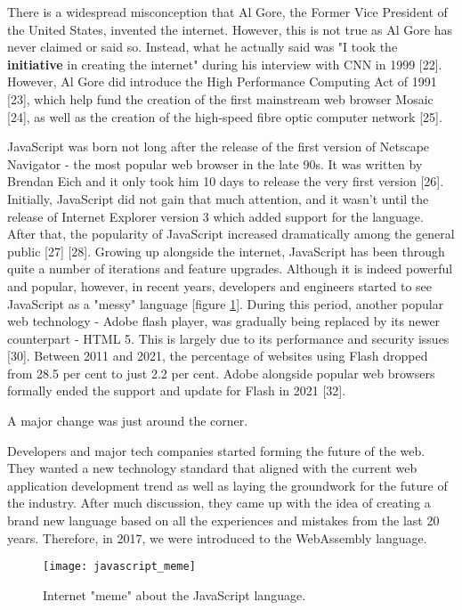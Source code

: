 There is a widespread misconception that Al Gore, the Former Vice President of the United States, invented the internet. However, this is not true as Al Gore has never claimed or said so. Instead, what he actually said was "I took the \textbf{initiative} in creating the internet" during his interview with CNN in 1999 [22]. However, Al Gore did introduce the High Performance Computing Act of 1991 [23], which help fund the creation of the first mainstream web browser Mosaic [24], as well as the creation of the high-speed fibre optic computer network [25].

JavaScript was born not long after the release of the first version of Netscape Navigator - the most popular web browser in the late 90s. It was written by Brendan Eich and it only took him 10 days to release the very first version [26]. Initially, JavaScript did not gain that much attention, and it wasn't until the release of Internet Explorer version 3 which added support for the language. After that, the popularity of JavaScript increased dramatically among the general public [27] [28]. Growing up alongside the internet, JavaScript has been through quite a number of iterations and feature upgrades. Although it is indeed powerful and popular, however, in recent years, developers and engineers started to see JavaScript as a "messy" language [figure \ref{fig:javascript_meme}]. During this period, another popular web technology - Adobe flash player, was gradually being replaced by its newer counterpart - HTML 5. This is largely due to its performance and security issues [30]. Between 2011 and 2021, the percentage of websites using Flash dropped from 28.5 per cent to just 2.2 per cent. Adobe alongside popular web browsers formally ended the support and update for Flash in 2021 [32].

A major change was just around the corner.

Developers and major tech companies started forming the future of the web. They wanted a new technology standard that aligned with the current web application development trend as well as laying the groundwork for the future of the industry. After much discussion, they came up with the idea of creating a brand new language based on all the experiences and mistakes from the last 20 years. Therefore, in 2017, we were introduced to the WebAssembly language.

\bigskip
\begin{figure}[hp]
\centering
\texttt{[image: javascript\_meme]}
\caption{\footnotesize{Internet "meme" about the JavaScript language.}}
\captionsetup{aboveskip=0pt,font=it}
\label{fig:javascript_meme}
\end{figure}
\bigskip

